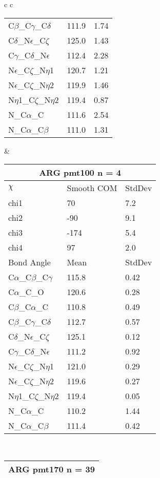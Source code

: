 \begin{longtable}{ c c }
\begin{tabular}{ l l l }
  C$\beta$\_C$\gamma$\_C$\delta$ & 111.9 & 1.74\\
  C$\delta$\_N$\epsilon$\_C$\zeta$ & 125.0 & 1.43\\
  C$\gamma$\_C$\delta$\_N$\epsilon$ & 112.4 & 2.28\\
  N$\epsilon$\_C$\zeta$\_N$\eta$1 & 120.7 & 1.21\\
  N$\epsilon$\_C$\zeta$\_N$\eta$2 & 119.9 & 1.46\\
  N$\eta$1\_C$\zeta$\_N$\eta$2 & 119.4 & 0.87\\
  N\_C$\alpha$\_C & 111.6 & 2.54\\
  N\_C$\alpha$\_C$\beta$ & 111.0 & 1.31\\
  \bottomrule
  \end{tabular}
  &
  \begin{tabular}{ l l l }
  \toprule
  \multicolumn{3}{c}{ARG \textbf{pmt100} n = 4} \\ \toprule
  $\chi$       & Smooth COM & StdDev \\ \midrule
  chi1 & 70 & 7.2 \\ 
  chi2 & -90 & 9.1 \\ 
  chi3 & -174 & 5.4 \\ 
  chi4 & 97 & 2.0 \\ \midrule
  Bond Angle   & Mean     & StdDev \\ \midrule
  C$\alpha$\_C$\beta$\_C$\gamma$ & 115.8 & 0.42\\
  C$\alpha$\_C\_O & 120.6 & 0.28\\
  C$\beta$\_C$\alpha$\_C & 110.8 & 0.49\\
  C$\beta$\_C$\gamma$\_C$\delta$ & 112.7 & 0.57\\
  C$\delta$\_N$\epsilon$\_C$\zeta$ & 125.1 & 0.12\\
  C$\gamma$\_C$\delta$\_N$\epsilon$ & 111.2 & 0.92\\
  N$\epsilon$\_C$\zeta$\_N$\eta$1 & 121.0 & 0.29\\
  N$\epsilon$\_C$\zeta$\_N$\eta$2 & 119.6 & 0.27\\
  N$\eta$1\_C$\zeta$\_N$\eta$2 & 119.4 & 0.05\\
  N\_C$\alpha$\_C & 110.2 & 1.44\\
  N\_C$\alpha$\_C$\beta$ & 111.4 & 0.42\\
  \bottomrule
  \end{tabular}
  \\
  \begin{tabular}{ l l l }
  \toprule
  \multicolumn{3}{c}{ARG \textbf{pmt170} n = 39} \\ \toprule

\end{tabular}
\end{longtable}
